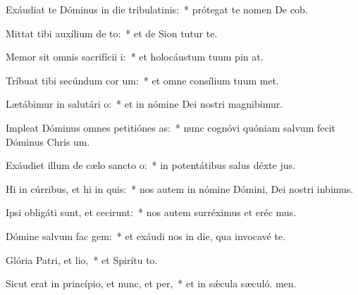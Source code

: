 \item Exáudiat te Dóminus in die tribulatinis:~* prótegat te nomen De cob.
\item Mittat tibi auxílium de to:~* et de Sion tutur te.
\item Memor sit omnis sacrifícii i:~* et holocáustum tuum pin at.
\item Tríbuat tibi secúndum cor um:~* et omne consílium tuum met.
\item Lætábimur in salutári o:~* et in nómine Dei nostri magnibimur.
\item Impleat Dóminus omnes petitiónes as:~* nunc cognóvi quóniam salvum fecit Dóminus Chris um.
\item Exáudiet illum de cælo sancto o:~* in potentátibus salus déxte jus.
\item Hi in cúrribus, et hi in quis:~* nos autem in nómine Dómini, Dei nostri inbimus.
\item Ipsi obligáti sunt, et cecirunt:~* nos autem surréximus et eréc mus.
\item Dómine salvum fac gem:~* et exáudi nos in die, qua invocavé te.
\item Glória Patri, et lio,~* et Spirítu to.
\item Sicut erat in princípio, et nunc, et per,~* et in sǽcula sæculó. men.
